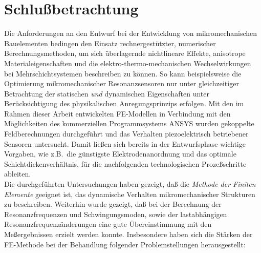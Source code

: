 \chapter{Schlußbetrachtung}
\label{schluss}

Die Anforderungen an den Entwurf bei der Entwicklung von mikromechanischen
Bauelementen bedingen den Einsatz rechnergestützter, numerischer
Berechnungsmethoden, um sich überlagernde nichtlineare Effekte, anisotrope
Materialeigenschaften und die elektro-thermo-mechanischen Wechselwirkungen
bei Mehrschichtsystemen beschreiben zu können. So kann beispielsweise die
Optimierung mikromechanischer Resonanzsensoren nur unter gleichzeitiger
Betrachtung der statischen {\em und} dynamischen Eigenschaften unter
Berücksichtigung des physikalischen Anregungsprinzips erfolgen.
Mit den im Rahmen dieser Arbeit entwickelten FE-Modellen in Verbindung mit
den Möglichkeiten des kommerziellen Programmsystems {\sf ANSYS} wurden
gekoppelte Feldberechnungen durchgeführt und das Verhalten piezoelektrisch
betriebener Sensoren untersucht. Damit ließen sich bereits
in der Entwurfsphase wichtige Vorgaben, wie z.B.\ die günstigste
Elektrodenanordnung und das optimale Schichtdickenverhältnis, für die
nachfolgenden technologischen Prozeßschritte ableiten.\\
%
Die durchgeführten Untersuchungen haben gezeigt, daß die {\em Methode der
Finiten Elemente} geeignet ist, das dynamische Verhalten mikromechanischer
Strukturen zu beschreiben. Weiterhin wurde gezeigt, daß bei der
Berechnung der Resonanzfrequenzen und Schwingungsmoden, sowie der
lastabhängigen Resonanzfrequenzänderungen eine gute Übereinstimmung mit den
Meßergebnissen erzielt werden konnte. Insbesondere haben sich die Stärken
der FE-Methode bei der Behandlung folgender Problemstellungen herausgestellt:
%
